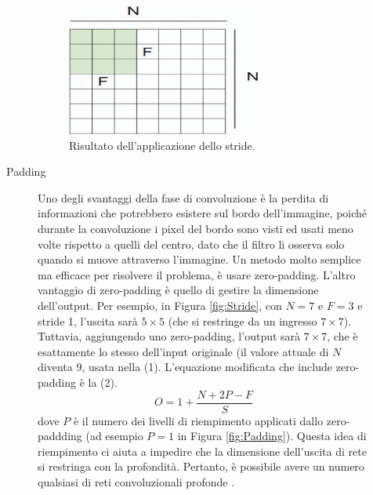 \begin{description}
\begin{description}
        \begin{figure}[h]
            \centering
            \includegraphics[width=0.7\textwidth]{images/CNN/fig_Stride2.png}
            \caption{Risultato dell'applicazione dello stride. \cite{8308186}}
            \label{fig:Stride2}
        \end{figure}

        \item[Padding] Uno degli svantaggi della fase di convoluzione è la perdita di informazioni che
        potrebbero esistere sul bordo dell'immagine, poiché durante la convoluzione i pixel del bordo sono 
        visti ed usati meno volte rispetto a quelli del centro, dato che il filtro li osserva solo quando 
        si muove attraverso l'immagine. Un metodo molto semplice ma efficace per risolvere il problema, è 
        usare zero-padding. L'altro vantaggio di zero-padding è quello di gestire la dimensione dell'output. 
        Per esempio, in Figura \ref{fig:Stride}, con $N=7$ e $F=3$ e stride 1, l'uscita sarà $5 \times 5$ 
        (che si restringe da un ingresso $7 \times 7$). Tuttavia, aggiungendo uno zero-padding, l'output 
        sarà $7 \times 7$, che è esattamente lo stesso dell'input originale (il valore attuale di $N$ 
        diventa 9, usata nella (1). L'equazione modificata che include zero-padding è la (2).
        \[ O=1+ \frac{N+2P-F}{S} \tag{2} \]
        dove $P$ è il numero dei livelli di riempimento applicati dallo zero-paddding (ad esempio $P=1$ in
        Figura \ref{fig:Padding}). Questa idea di riempimento ci aiuta a impedire che la dimensione dell'uscita
        di rete si restringa con la profondità. Pertanto, è possibile avere un numero qualsiasi di reti 
        convoluzionali profonde \cite{o2015introduction}.
    \end{description}


\end{description}
